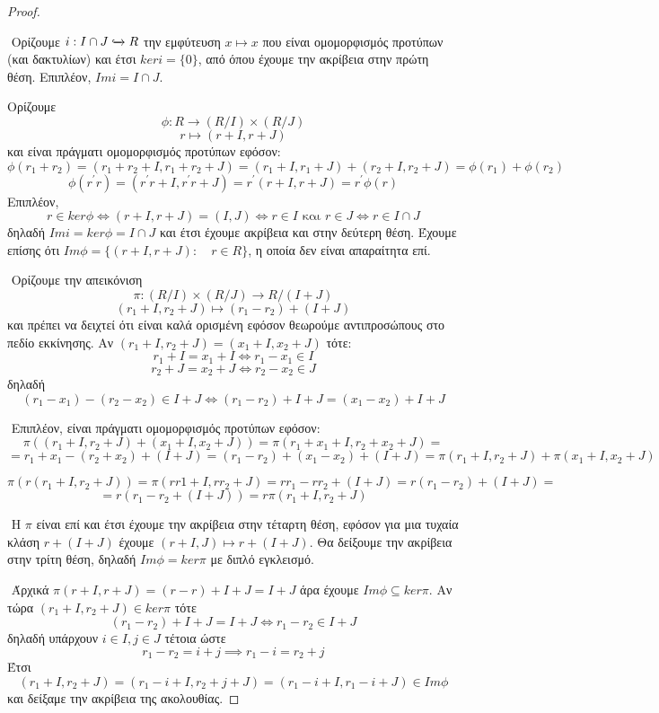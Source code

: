 \documentclass[oneside,a4paper]{article}
\begin{document}
\begin{proof} $ $

	$ $\newline
	Ορίζουμε $i: I\cap J \xhookrightarrow{} R$ την εμφύτευση $x\mapsto x$ που είναι ομομορφισμός προτύπων (και δακτυλίων) και έτσι $keri = \{0\}$, από όπου έχουμε την ακρίβεια στην πρώτη θέση. Επιπλέον, $Imi = I\cap J$.

	$ $\newline Ορίζουμε $$\phi: R \rightarrow (R/I) \times (R/J)$$
	$$r \mapsto (r+I,r+J)$$ και είναι πράγματι ομομορφισμός προτύπων εφόσον:
	$$\phi(r_1 + r_2) = (r_1 + r_2 + I, r_1 + r_2 + J) = (r_1 + I,r_1 + J) + (r_2 + I, r_2 + J) = \phi(r_1) + \phi(r_2)$$
	$$\phi(r^{\prime}r) = (r^{\prime}r + I, r^{\prime}r + J) = r^{\prime}(r+I,r+J)=r^{\prime}\phi(r)$$
	Επιπλέον, $$r \in ker\phi \iff (r+I,r+J) = (I,J) \iff r\in I \text{ και } r\in J \iff r \in I\cap J$$
	δηλαδή $Imi = ker\phi = I\cap J$ και έτσι έχουμε ακρίβεια και στην δεύτερη θέση. Έχουμε επίσης ότι $Im\phi = \{(r+I,r+J): \quad r\in R\}$, η οποία δεν είναι απαραίτητα επί.

	$ $\newline
	Ορίζουμε την απεικόνιση $$\pi : (R/I)\times (R/J) \rightarrow R/(I+J)$$
	$$(r_1 + I, r_2 + J) \mapsto (r_1 - r_2) + (I+J)$$
	και πρέπει να δειχτεί ότι είναι καλά ορισμένη εφόσον θεωρούμε αντιπροσώπους στο πεδίο εκκίνησης. Αν $(r_1+I,r_2+J)=(x_1+I,x_2 +J)$ τότε:
	$$r_1 + I = x_1 + I \iff r_1 - x_1 \in I$$
	$$r_2 + J = x_2 + J \iff r_2 - x_2 \in J$$
	δηλαδή $$(r_1 - x_1) - (r_2 - x_2) \in I + J \iff (r_1 - r_2) + I+J = (x_1 - x_2) + I+J$$

	
	
	$ $\newline
	Επιπλέον, είναι πράγματι ομομορφισμός προτύπων εφόσον:
	$$\pi\left((r_1 + I, r_2 + J) + (x_1 + I, x_2 + J)\right) = \pi( r_1 + x_1 + I, r_2 + x_2 +J) = $$
	$$= r_1 + x_1 - (r_2 + x_2) + (I+J) = (r_1 - r_2) + (x_1 - x_2) + (I+J) = \pi(r_1+I,r_2+J) + \pi(x_1 + I, x_2 + J)$$
	
	$$\pi(r(r_1+I,r_2+J)) = \pi(rr1+I,rr_2 + J) = rr_1 -rr_2 + (I+J) = r(r_1-r_2) + (I+J) = $$
	$$ =  r \left(r_1 - r_2 + (I+J)\right) = r \pi(r_1 + I,r_2 +J)$$

	
	$ $\newline 
	Η $\pi$ είναι επί και έτσι έχουμε την ακρίβεια στην τέταρτη θέση, εφόσον για μια τυχαία κλάση $r + (I+J)$ έχουμε $(r+I,J)\mapsto r +(I+J)$. Θα δείξουμε την ακρίβεια στην τρίτη θέση, δηλαδή $Im\phi = ker\pi$ με διπλό εγκλεισμό.

	$ $\newline
	Άρχικά $\pi (r +I,r+J) = (r-r) + I+J = I+J$ άρα έχουμε $Im\phi \subseteq ker\pi$. Αν τώρα $(r_1+I,r_2 +J) \in ker\pi$ τότε $$(r_1 - r_2) + I+J = I+J \iff r_1 - r_2 \in I+J$$ δηλαδή υπάρχουν $i \in I,j \in J$ τέτοια ώστε $$r_1 - r_2 = i+j \implies r_1 - i = r_2 + j $$
	Έτσι $$(r_1 + I, r_2 + J) = (r_1 - i + I, r_2 + j +J) = (r_1 - i + I, r_1 -i +J) \in Im\phi$$ και δείξαμε την ακρίβεια της ακολουθίας.


\end{proof}
\end{document}
